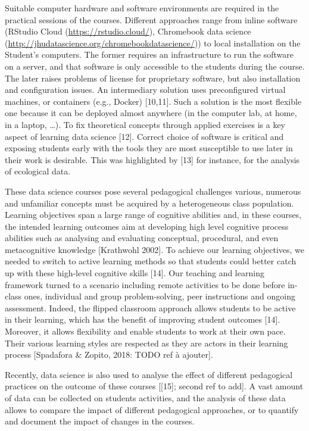 \documentclass[
]{article}
\begin{document}
Suitable computer hardware and software environments are required in the
practical sessions of the courses. Different approaches range from
inline software (RStudio Cloud (\url{https://rstudio.cloud/}),
Chromebook data science
(\url{http://jhudatascience.org/chromebookdatascience/})) to local
installation on the Student's computers. The former requires an
infrastructure to run the software on a server, and that software is
only accessible to the students during the course. The later raises
problems of license for proprietary software, but also installation and
configuration issues. An intermediary solution uses preconfigured
virtual machines, or containers (e.g., Docker) {[}10,11{]}. Such a
solution is the most flexible one because it can be deployed almost
anywhere (in the computer lab, at home, in a laptop, \ldots). To fix
theoretical concepts through applied exercises is a key aspect of
learning data science {[}12{]}. Correct choice of software is critical
and exposing students early with the tools they are most susceptible to
use later in their work is desirable. This was highlighted by {[}13{]}
for instance, for the analysis of ecological data.

These data science courses pose several pedagogical challenges various,
numerous and unfamiliar concepts must be acquired by a heterogeneous
class population. Learning objectives span a large range of cognitive
abilities and, in these courses, the intended learning outcomes aim at
developing high level cognitive process abilities such as analysing and
evaluating conceptual, procedural, and even metacognitive knowledge
{[}Krathwohl 2002{]}. To achieve our learning objectives, we needed to
switch to active learning methods so that students could better catch up
with these high-level cognitive skills {[}14{]}. Our teaching and
learning framework turned to a scenario including remote activities to
be done before in-class ones, individual and group problem-solving, peer
instructions and ongoing assessment. Indeed, the flipped classroom
approach allows students to be active in their learning, which has the
benefit of improving student outcomes {[}14{]}. Moreover, it allows
flexibility and enable students to work at their own pace. Their various
learning styles are respected as they are actors in their learning
process {[}Spadafora \& Zopito, 2018: TODO ref à ajouter{]}.

Recently, data science is also used to analyse the effect of different
pedagogical practices on the outcome of these courses {[}{[}15{]};
second ref to add{]}. A vast amount of data can be collected on students
activities, and the analysis of these data allows to compare the impact
of different pedagogical approaches, or to quantify and document the
impact of changes in the courses.
\end{document}
